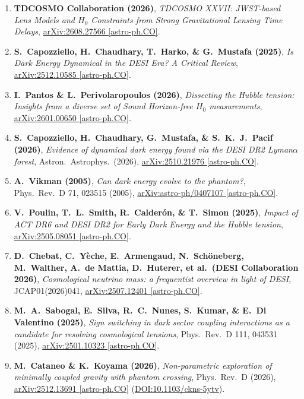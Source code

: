 \documentclass[11pt,letterpaper]{article}
\begin{document}
\begin{enumerate}
    \item \textbf{TDCOSMO Collaboration (2026)}, \emph{TDCOSMO XXVII: JWST-based Lens Models and $H_0$ Constraints from Strong Gravitational Lensing Time Delays}, \href{https://arxiv.org/abs/2608.27566}{arXiv:2608.27566 [astro-ph.CO]}.
    \item \textbf{S.\ Capozziello, H.\ Chaudhary, T.\ Harko, \& G.\ Mustafa (2025)}, \emph{Is Dark Energy Dynamical in the DESI Era? A Critical Review}, \href{https://arxiv.org/abs/2512.10585}{arXiv:2512.10585 [astro-ph.CO]}.
    \item \textbf{I.\ Pantos \& L.\ Perivolaropoulos (2026)}, \emph{Dissecting the Hubble tension: Insights from a diverse set of Sound Horizon-free $H_0$ measurements}, \href{https://arxiv.org/abs/2601.00650}{arXiv:2601.00650 [astro-ph.CO]}.
    \item \textbf{S.\ Capozziello, H.\ Chaudhary, G.\ Mustafa, \& S.\ K.\ J.\ Pacif (2026)}, \emph{Evidence of dynamical dark energy found via the DESI DR2 Lyman$\alpha$ forest}, Astron.\ Astrophys.\ (2026), \href{https://arxiv.org/abs/2510.21976}{arXiv:2510.21976 [astro-ph.CO]}.
    \item \textbf{A.\ Vikman (2005)}, \emph{Can dark energy evolve to the phantom?}, Phys.\ Rev.\ D 71, 023515 (2005), \href{https://arxiv.org/abs/astro-ph/0407107}{arXiv:astro-ph/0407107 [astro-ph.CO]}.
    \item \textbf{V.\ Poulin, T.\ L.\ Smith, R.\ Calder\'on, \& T.\ Simon (2025)}, \emph{Impact of ACT DR6 and DESI DR2 for Early Dark Energy and the Hubble tension}, \href{https://arxiv.org/abs/2505.08051}{arXiv:2505.08051 [astro-ph.CO]}.
    \item \textbf{D.\ Chebat, C.\ Y\`eche, E.\ Armengaud, N.\ Sch\"oneberg, M.\ Walther, A.\ de Mattia, D.\ Huterer, et al.\ (DESI Collaboration 2026)}, \emph{Cosmological neutrino mass: a frequentist overview in light of DESI}, JCAP01(2026)041, \href{https://arxiv.org/abs/2507.12401}{arXiv:2507.12401 [astro-ph.CO]}.
    \item \textbf{M.\ A.\ Sabogal, E.\ Silva, R.\ C.\ Nunes, S.\ Kumar, \& E.\ Di Valentino (2025)}, \emph{Sign switching in dark sector coupling interactions as a candidate for resolving cosmological tensions}, Phys.\ Rev.\ D 111, 043531 (2025), \href{https://arxiv.org/abs/2501.10323}{arXiv:2501.10323 [astro-ph.CO]}.
    \item \textbf{M.\ Cataneo \& K.\ Koyama (2026)}, \emph{Non-parametric exploration of minimally coupled gravity with phantom crossing}, Phys.\ Rev.\ D (2026), \href{https://arxiv.org/abs/2512.13691}{arXiv:2512.13691 [astro-ph.CO]} (\href{https://journals.aps.org/prd/abstract/10.1103/ckns-5ytv}{DOI:10.1103/ckns-5ytv}).

\end{enumerate}
\end{document}
